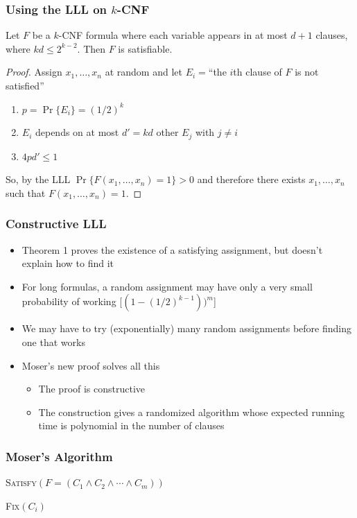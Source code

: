 \documentclass{beamer}
\begin{document}
\frame
{
  \frametitle{Using the LLL on $k$-CNF}

  \begin{thm}
    Let $F$ be a $k$-CNF formula where each variable appears in
    at most $d+1$ clauses, where $kd \le 2^{k-2}$.  Then $F$
    is satisfiable.
  \end{thm}
  \begin{proof}
    Assign $x_1,\ldots,x_n$ at random and let
    $E_i=$``the $i$th clause of $F$ is not satisfied''
    \begin{enumerate}
    \item $p=\Pr\{E_i\} = (1/2)^k$
    \item $E_i$ depends on at most $d'=kd$ other $E_j$ with $j\neq i$
    \item $4pd' \le 1$
  \end{enumerate}
  So, by the LLL $\Pr\{F(x_1,\ldots,x_n)=1\} > 0$ and therefore there
exists $x_1,\ldots,x_n$ such that $F(x_1,\ldots,x_n) = 1$.
  \end{proof}
}

\frame
{
  \frametitle{Constructive LLL}

  \begin{itemize}
    \item Theorem 1 proves the existence of a satisfying assignment, but
          doesn't explain how to find it
    \item For long formulas, a random assignment may have only a  very 
       small probability of working [$(1-(1/2)^{k-1}))^m$]
    \item We may have to try (exponentially) many random assignments before
       finding one that works
    \item Moser's new proof solves all this
    \begin{itemize}
      \item The proof is constructive
      \item The construction gives a randomized algorithm whose expected
            running time is polynomial in the number of clauses
    \end{itemize}
  \end{itemize}
}

\frame
{
  \frametitle{Moser's Algorithm}

  \noindent\textsc{Satisfy$(F=(C_1\wedge C_2\wedge\cdots\wedge C_m))$}
  \begin{algorithmic}
     \ENDIF
   \ENDFOR
  \end{algorithmic}
  \vspace{1ex}
  \noindent\textsc{Fix$(C_i)$}
  \begin{algorithmic}
     \ENDIF
   \ENDFOR
  \end{algorithmic}
}
\end{document}
